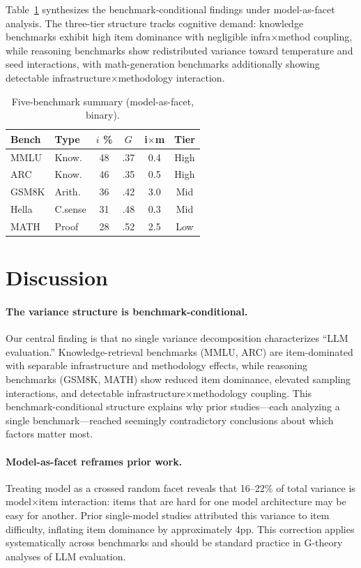 \documentclass[11pt,twocolumn]{article}
\begin{document}
Table~\ref{tab:summary} synthesizes the benchmark-conditional findings under model-as-facet analysis. The three-tier structure tracks cognitive demand: knowledge benchmarks exhibit high item dominance with negligible infra$\times$method coupling, while reasoning benchmarks show redistributed variance toward temperature and seed interactions, with math-generation benchmarks additionally showing detectable infrastructure$\times$methodology interaction.

\begin{table}[t]
\centering
\caption{Five-benchmark summary (model-as-facet, binary).}
\label{tab:summary}
\small
\begin{tabular}{@{}llcccc@{}}
\toprule
Bench & Type & $i$ \% & $G$ & i$\times$m & Tier \\
\midrule
MMLU & Know. & 48 & .37 & 0.4 & High \\
ARC & Know. & 46 & .35 & 0.5 & High \\
GSM8K & Arith. & 36 & .42 & 3.0 & Mid \\
Hella & C.sense & 31 & .48 & 0.3 & Mid \\
MATH & Proof & 28 & .52 & 2.5 & Low \\
\bottomrule
\end{tabular}
\end{table}

\section{Discussion}

\paragraph{The variance structure is benchmark-conditional.}
Our central finding is that no single variance decomposition characterizes ``LLM evaluation.'' Knowledge-retrieval benchmarks (MMLU, ARC) are item-dominated with separable infrastructure and methodology effects, while reasoning benchmarks (GSM8K, MATH) show reduced item dominance, elevated sampling interactions, and detectable infrastructure$\times$methodology coupling. This benchmark-conditional structure explains why prior studies---each analyzing a single benchmark---reached seemingly contradictory conclusions about which factors matter most.

\paragraph{Model-as-facet reframes prior work.}
Treating model as a crossed random facet reveals that 16--22\% of total variance is model$\times$item interaction: items that are hard for one model architecture may be easy for another. Prior single-model studies attributed this variance to item difficulty, inflating item dominance by approximately 4pp. This correction applies systematically across benchmarks and should be standard practice in G-theory analyses of LLM evaluation.
\end{document}
